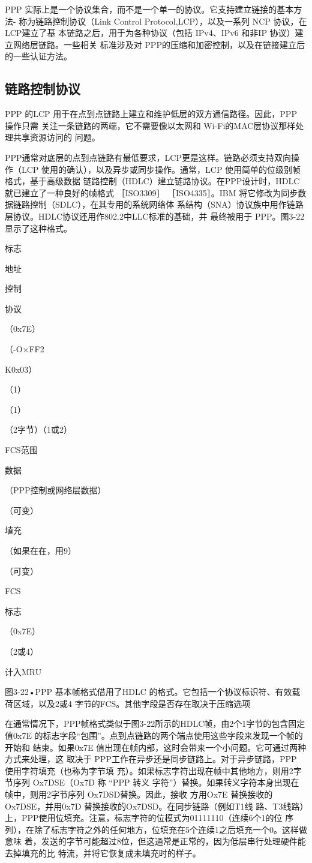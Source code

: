 PPP 实际上是一个协议集合，而不是一个单一的协议。它支持建立链接的基本方法-
称为链路控制协议（Link Control Protocol,LCP），以及一系列 NCP 协议，在LCP建立了基
本链路之后，用于为各种协议（包括 IPv4、IPv6 和非IP 协议）建立网络层链路。一些相关
标准涉及对 PPP的压缩和加密控制，以及在链接建立后的一些认证方法。

\subsection{链路控制协议}

PPP 的LCP 用于在点到点链路上建立和维护低层的双方通信路径。因此，PPP 操作只需
关注一条链路的两端，它不需要像以太网和 Wi-Fi的MAC层协议那样处理共享资源访问的
问题。

PPP通常对底层的点到点链路有最低要求，LCP更是这样。链路必须支持双向操作（LCP
使用的确认），以及异步或同步操作。通常，LCP 使用简单的位级别帧格式，基于高级数据
链路控制（HDLC）建立链路协议。在PPP设计时，HDLC就已建立了一种良好的帧格式
［ISO3309］ ［ISO4335］。IBM 将它修改为同步数据链路控制（SDLC），在其专用的系统网络体
系结构（SNA）协议族中用作链路层协议。HDLC协议还用作802.2中LLC标准的基础，并
最终被用于 PPP。图3-22显示了这种格式。

标志

地址

控制

协议

（0x7E）

（-O×FF2

K0x03）

（1）

（1）

（2字节）（1或2）

FCS范围

数据

（PPP控制或网络层数据）

（可变）

埴充

（如果在在，用9）

（可变）

FCS

标志

（0x7E）

（2或4）

计入MRU

图3-22•PPP 基本帧格式借用了HDLC 的格式。它包括一个协议标识符、有效载荷区域，以及2或4
字节的FCS。其他字段是否存在取决于压缩选项

在通常情况下，PPP帧格式类似于图3-22所示的HDLC帧，由2个1字节的包含固定
值0x7E 的标志字段“包围”。点到点链路的两个端点使用这些字段来发现一个帧的开始和
结束。如果0x7E 值出现在帧内部，这时会带来一个小问题。它可通过两种方式来处理，这
取决于 PPP工作在异步还是同步链路上。对于异步链路，PPP 使用字符填充（也称为字节填
充）。如果标志字符出现在帧中其他地方，则用2字节序列 Ox7DSE（Ox7D 称 “PPP 转义
字符”）替换。如果转义字符本身出现在帧中，则用2字节序列 Ox7DSD替换。因此，接收
方用Ox7E 替换接收的Ox7DSE，并用0x7D 替换接收的Ox7DSD。在同步链路（例如T1线
路、T3线路）上，PPP使用位填充。注意，标志字符的位模式为01111110（连续6个1的位
序列），在除了标志字符之外的任何地方，位填充在5个连续1之后填充一个0。这样做意味
着，发送的字节可能超过8位，但这通常是正常的，因为低层串行处理硬件能去掉填充的比
特流，并将它恢复成未填充时的样子。

